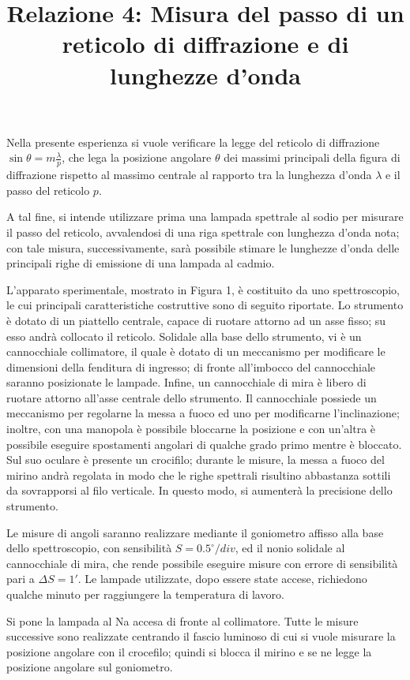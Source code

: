 \documentclass{article}
\title{Relazione 4: Misura del passo di un reticolo di diffrazione e di lunghezze d'onda}
\date{}
\begin{document}
 \maketitle	
	
Nella presente esperienza si vuole verificare la legge del reticolo di diffrazione $\sin{\theta}=m\frac{\lambda}{p}$, che lega la posizione angolare $\theta$ dei massimi principali della figura di diffrazione rispetto al massimo centrale al rapporto tra la lunghezza
d'onda $\lambda$ e il passo del reticolo $p$.
	
A tal fine, si intende utilizzare prima una lampada spettrale al sodio per misurare il passo del reticolo, avvalendosi di una riga spettrale con lunghezza d'onda nota; con tale misura, successivamente, sarà possibile stimare le lunghezze d'onda delle principali righe
di emissione di una lampada al cadmio.

L'apparato sperimentale, mostrato in Figura 1, è costituito da uno spettroscopio, le cui principali caratteristiche costruttive sono di seguito riportate.
Lo strumento è dotato di un piattello centrale, capace di ruotare attorno ad un asse fisso; su esso andrà collocato il reticolo.
Solidale alla base dello strumento, vi è un cannocchiale collimatore, il quale è dotato di un meccanismo per modificare le dimensioni della fenditura di ingresso; di fronte all'imbocco del cannocchiale saranno posizionate le lampade. 
Infine, un cannocchiale di mira è libero di ruotare attorno all'asse centrale dello strumento. Il cannocchiale possiede un meccanismo per regolarne la messa a fuoco ed uno per modificarne l'inclinazione; 
inoltre, con una manopola è possibile bloccarne la posizione e con un'altra è possibile eseguire spostamenti angolari di qualche grado primo mentre è bloccato.
Sul suo oculare è presente un crocifilo; durante le misure, la messa a fuoco del mirino andrà regolata in modo che le righe spettrali risultino abbastanza sottili da sovrapporsi al filo verticale. In questo modo, si aumenterà la precisione dello strumento.   

Le misure di angoli saranno realizzare mediante il goniometro affisso alla base dello spettroscopio, con sensibilità $S=0.5^{\circ} / div$, ed il nonio solidale al cannocchiale di mira, che rende possibile eseguire misure con errore di sensibilità pari a
$\Delta S = 1'$.
Le lampade utilizzate, dopo essere state accese, richiedono qualche minuto per raggiungere la temperatura di lavoro.

Si pone la lampada al Na accesa di fronte al collimatore.
Tutte le misure successive sono realizzate centrando il fascio luminoso di cui si vuole misurare la posizione angolare con il crocefilo; quindi si blocca il mirino e se ne legge la posizione angolare sul goniometro.
\end{document}
